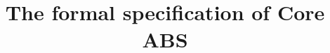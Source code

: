 \documentclass[a4paper,10pt]{article}
\title{The formal specification of Core ABS}
\author{}
\date{}
\begin{document}
\maketitle
\coreabsmetavars\\
\coreabsgrammar\\
\coreabsdefnss
\end{document}
